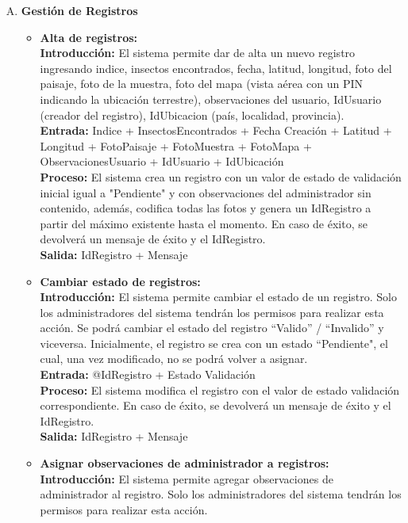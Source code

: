 \begin{enumerate}[A.]
      \item \textbf{Gestión de Registros}
        \begin{itemize}
          \item \textbf{Alta de registros:}
            \\ \textbf{Introducción:} El sistema permite dar de alta un nuevo registro ingresando indice, insectos encontrados, fecha, latitud, longitud, foto del paisaje, foto de la muestra, foto del mapa (vista aérea con un PIN indicando la ubicación terrestre), observaciones del usuario, IdUsuario (creador del registro), IdUbicacion (país, localidad, provincia).
            \\ \textbf{Entrada:} Indice + InsectosEncontrados + Fecha Creación + Latitud + Longitud + FotoPaisaje + FotoMuestra + FotoMapa + ObservacionesUsuario + IdUsuario + IdUbicación
            \\ \textbf{Proceso:} El sistema crea un registro con un valor de estado de validación inicial igual a "Pendiente" y con observaciones del administrador sin contenido, además, codifica todas las fotos y genera un IdRegistro a partir del máximo existente hasta el momento. En caso de éxito, se devolverá un mensaje de éxito y el IdRegistro.
            \\ \textbf{Salida:} IdRegistro + Mensaje
            \\
          \item \textbf{Cambiar estado de registros:}
            \\ \textbf{Introducción:} El sistema permite cambiar el estado de un registro. Solo los administradores del sistema tendrán los permisos para realizar esta acción. Se podrá cambiar el estado del registro ``Valido'' / ``Invalido'' y viceversa. Inicialmente, el registro se crea con un estado ``Pendiente", el cual, una vez modificado, no se podrá volver a asignar.
            \\ \textbf{Entrada:} @IdRegistro + Estado Validación
            \\ \textbf{Proceso:} El sistema modifica el registro con el valor de estado validación correspondiente. En caso de éxito, se devolverá un mensaje de éxito y el IdRegistro.
            \\ \textbf{Salida:} IdRegistro + Mensaje
            \\
          \item \textbf{Asignar observaciones de administrador a registros:}
            \\ \textbf{Introducción:} El sistema permite agregar observaciones de administrador al registro. Solo los administradores del sistema tendrán los permisos para realizar esta acción.

\end{itemize}
\end{enumerate}
